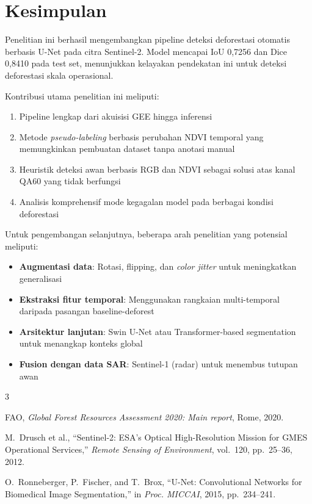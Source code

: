 \documentclass[12pt,a4paper]{article}
\begin{document}
\section{Kesimpulan}
\label{sec:kesimpulan}

Penelitian ini berhasil mengembangkan pipeline deteksi deforestasi otomatis 
berbasis U-Net pada citra Sentinel-2. Model mencapai IoU 0,7256 dan Dice 0,8410 
pada test set, menunjukkan kelayakan pendekatan ini untuk deteksi deforestasi 
skala operasional.

Kontribusi utama penelitian ini meliputi:

\begin{enumerate}[nosep]
    \item Pipeline lengkap dari akuisisi GEE hingga inferensi
    \item Metode \textit{pseudo-labeling} berbasis perubahan NDVI temporal 
          yang memungkinkan pembuatan dataset tanpa anotasi manual
    \item Heuristik deteksi awan berbasis RGB dan NDVI sebagai solusi atas 
          kanal QA60 yang tidak berfungsi
    \item Analisis komprehensif mode kegagalan model pada berbagai kondisi 
          deforestasi
\end{enumerate}

Untuk pengembangan selanjutnya, beberapa arah penelitian yang potensial meliputi:

\begin{itemize}[nosep]
    \item \textbf{Augmentasi data}: Rotasi, flipping, dan \textit{color jitter} 
          untuk meningkatkan generalisasi
    \item \textbf{Ekstraksi fitur temporal}: Menggunakan rangkaian multi-temporal 
          daripada pasangan baseline-deforest
    \item \textbf{Arsitektur lanjutan}: Swin U-Net atau Transformer-based 
          segmentation untuk menangkap konteks global
    \item \textbf{Fusion dengan data SAR}: Sentinel-1 (radar) untuk menembus 
          tutupan awan
\end{itemize}


\begin{thebibliography}{3}

FAO,
\emph{Global Forest Resources Assessment 2020: Main report},
Rome, 2020.

M.~Drusch et al.,
``Sentinel-2: ESA's Optical High-Resolution Mission for GMES Operational Services,''
\emph{Remote Sensing of Environment}, vol.~120, pp.~25--36, 2012.

O.~Ronneberger, P.~Fischer, and T.~Brox,
``U-Net: Convolutional Networks for Biomedical Image Segmentation,''
in \emph{Proc. MICCAI}, 2015, pp.~234--241.

\end{thebibliography}
\end{document}
